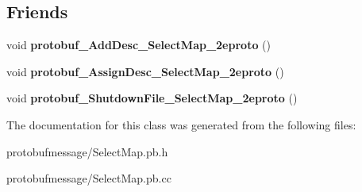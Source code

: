 \subsection*{Friends}
\begin{DoxyCompactItemize}
\item 
\hypertarget{class_select_map_aad2611d2dc5aa84e66de3ab9abaa4b62}{void {\bfseries protobuf\-\_\-\-Add\-Desc\-\_\-\-Select\-Map\-\_\-2eproto} ()}\label{class_select_map_aad2611d2dc5aa84e66de3ab9abaa4b62}

\item 
\hypertarget{class_select_map_af70cd852226b57cecb6d29ffbb5455af}{void {\bfseries protobuf\-\_\-\-Assign\-Desc\-\_\-\-Select\-Map\-\_\-2eproto} ()}\label{class_select_map_af70cd852226b57cecb6d29ffbb5455af}

\item 
\hypertarget{class_select_map_a84edfc241ea5eb06701606ff9426e996}{void {\bfseries protobuf\-\_\-\-Shutdown\-File\-\_\-\-Select\-Map\-\_\-2eproto} ()}\label{class_select_map_a84edfc241ea5eb06701606ff9426e996}

\end{DoxyCompactItemize}


The documentation for this class was generated from the following files\-:\begin{DoxyCompactItemize}
\item 
protobufmessage/Select\-Map.\-pb.\-h\item 
protobufmessage/Select\-Map.\-pb.\-cc\end{DoxyCompactItemize}
